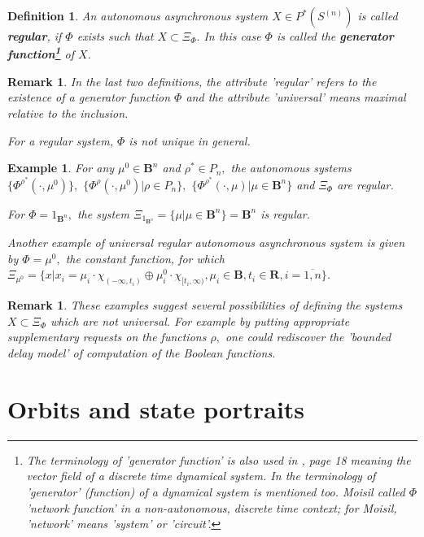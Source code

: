 \documentclass[12pt]{article}\usepackage{amsmath}
\newtheorem{definition}[theorem]{Definition}
\newtheorem{example}[theorem]{Example}
\newtheorem{remark}[theorem]{Remark}
\begin{document}
\begin{definition}
An autonomous asynchronous system $X\in P^{\ast}(S^{(n)})$ is called
\textbf{regular}, if $\Phi$ exists such that $X\subset\Xi_{\Phi}.$ In this
case $\Phi$ is called the \textbf{generator function\footnote{The terminology
of 'generator function' is also used in \cite{bib4}, page 18 meaning the
vector field of a discrete time dynamical system. In \cite{bib6} the
terminology of 'generator' (function) of a dynamical system is mentioned too.
Moisil called $\Phi$ 'network function' in a non-autonomous, discrete time
context; for Moisil, 'network' means 'system' or 'circuit'.}} of $X$.
\end{definition}

\begin{remark}
In the last two definitions, the attribute 'regular' refers to the existence
of a generator function $\Phi$ and the attribute 'universal' means maximal
relative to the inclusion.

For a regular system, $\Phi$ is not unique in general.
\end{remark}

\begin{example}
For any $\mu^{0}\in\mathbf{B}^{n}$ and $\rho^{\ast}\in P_{n},$ the autonomous
systems $\{\Phi^{\rho^{\ast}}(\cdot,\mu^{0})\},$ $\{\Phi^{\rho}(\cdot,\mu
^{0})|\rho\in P_{n}\},$ $\{\Phi^{\rho^{\ast}}(\cdot,\mu)|\mu\in\mathbf{B}^{n}\}$ and $\Xi_{\Phi}$ are regular.

For $\Phi=1_{\mathbf{B}^{n}},$ the system $\Xi_{1_{\mathbf{B}^{n}}}=\{\mu
|\mu\in\mathbf{B}^{n}\}=\mathbf{B}^{n}$ is regular.

Another example of universal regular autonomous asynchronous system is given
by $\Phi=\mu^{0},$ the constant function, for which $\Xi_{\mu^{0}}=\{x|x_{i}=\mu_{i}\cdot\chi_{(-\infty,t_{i})}\oplus\mu_{i}^{0}\cdot
\chi_{\lbrack t_{i},\infty)},\mu_{i}\in\mathbf{B},t_{i}\in\mathbf{R},i=\overline{1,n}\}$.
\end{example}

\begin{remark}
These examples suggest several possibilities of defining the systems
$X\subset\Xi_{\Phi}$ which are not universal. For example by putting
appropriate supplementary requests on the functions $\rho,$ one could
rediscover the 'bounded delay model' of computation of the Boolean functions.
\end{remark}

\section{Orbits and state portraits}
\end{document}
